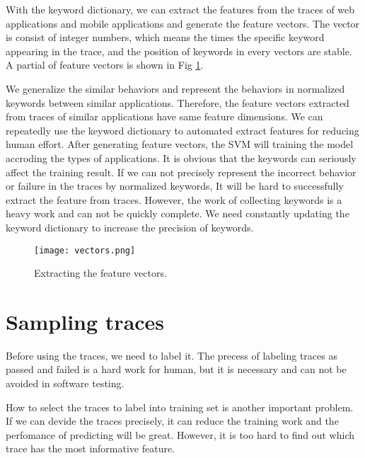 With the keyword dictionary, we can extract the features from the traces of web applications and mobile applications
and generate the feature vectors.
The vector is consist of integer numbers, which means the times the specific keyword appearing in the trace,
and the position of keywords in every vectors are stable.
A partial of feature vectors is shown in Fig \ref{featureVectors}.

We generalize the similar behaviors and represent the behaviors in normalized keywords between similar applications.
Therefore, the feature vectors extracted from traces of similar applications have same feature dimensions.
We can repeatedly use the keyword dictionary to automated extract features for reducing human effort.
After generating feature vectors, the SVM will training the model accroding the types of applications.
It is obvious that the keywords can seriously affect the training result.
If we can not precisely represent the incorrect behavior or failure in the traces by normalized keywords,
It will be hard to successfully extract the feature from traces.
However, the work of collecting keywords is a heavy work and can not be quickly complete.
We need constantly updating the keyword dictionary to increase the precision of keywords.

\begin{figure}[ht]
	\graphicspath{{pic/}}
	\begin{center}
		\texttt{[image: vectors.png]}
	\end{center}
	\caption{ Extracting the feature vectors. }
	\label{featureVectors}
\end{figure}


\clearpage

\section{Sampling traces}

Before using the traces, we need to label it.
The precess of labeling traces as passed and failed is a hard work for human,
but it is necessary and can not be avoided in software testing.

How to select the traces to label into training set is another important problem.
If we can devide the traces precisely,
it can reduce the training work and the perfomance of predicting will be great.
However, it is too hard to find out which trace has the most informative feature.

